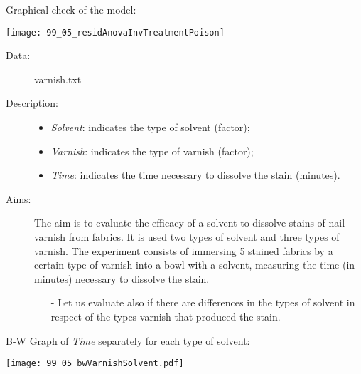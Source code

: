 \begin{frame}
   Graphical check of the model:\\
  \vspace{.1cm}
  \begin{center}
    \texttt{[image: 99\_05\_residAnovaInvTreatmentPoison]}
    \end{center}
\end{frame}


\begin{frame}
  \begin{description}
    \item[Data: ]varnish.txt \\ 
    \item[Description: ]
      \begin{footnotesize}
        \begin{itemize}
          \item \textit{Solvent}: indicates the type of solvent (factor);
          \item \textit{Varnish}: indicates the type of varnish (factor);
          \item \textit{Time}: indicates the time necessary to dissolve the stain (minutes).
        \end{itemize}
      \end{footnotesize}
    \item[Aims: ]
      \begin{footnotesize}
        The aim is to evaluate the efficacy of a solvent to dissolve stains of nail varnish from fabrics. It is used two types of solvent and three types of varnish. The experiment consists of immersing 5 stained fabrics by a certain type of varnish into a bowl with a solvent, measuring the time (in minutes) necessary to dissolve the stain. 
        \begin{itemize}
          \item[-] Let us evaluate also if there are differences in the types of solvent in respect of the types varnish that produced the stain.
        \end{itemize}
      \end{footnotesize}
  \end{description}
\end{frame}

\begin{frame}
  B-W Graph of \textit{Time} separately for each type of solvent:\\
  \vspace{-0.5cm}
  \begin{center}
    \texttt{[image: 99\_05\_bwVarnishSolvent.pdf]}
  \end{center}
\end{frame}

